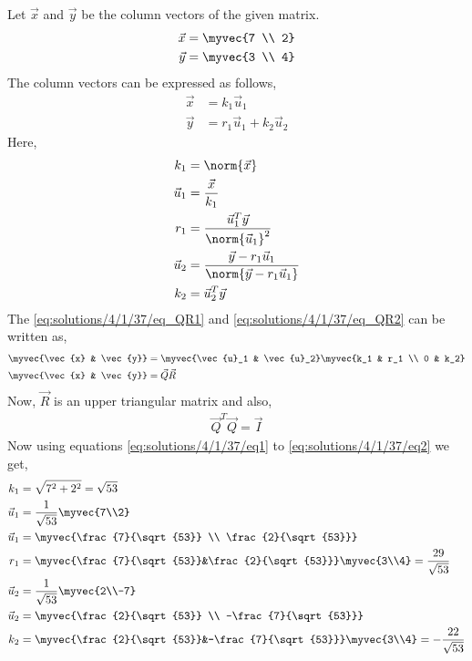 Let $\vec{x}$ and $\vec{y}$ be the column vectors of the given matrix.
\begin{align}
    \vec{x} &= \myvec{7 \\ 2} \\
    \vec{y} &= \myvec{3 \\ 4}
\end{align}
The column vectors can be expressed as follows,
\begin{align}
    \vec{x} &= k_1\vec{u}_1\label{eq:solutions/4/1/37/eq_QR1}\\
    \vec{y} &= r_1\vec{u}_1+k_2\vec{u}_2\label{eq:solutions/4/1/37/eq_QR2}
\end{align}
Here, 
\begin{align}
    k_1 &= \norm{\vec{x}}\label{eq:solutions/4/1/37/eq1}\\
    \vec{u}_1 &= \frac{\vec{x}}{k_1}\\
    r_1 &= \frac{\vec{u}_1^T\vec{y}}{\norm{\vec{u}_1}^2}\\
    \vec{u}_2 &= \frac{\vec{y} - r_1 \vec{u}_1}{\norm{\vec{y} - r_1 \vec{u}_1}}\\
    k_2 &= {\vec{u}_2^T\vec{y}}\label{eq:solutions/4/1/37/eq2}
\end{align}
The \eqref{eq:solutions/4/1/37/eq_QR1} and \eqref{eq:solutions/4/1/37/eq_QR2} can be written as, 
\begin{align}
\myvec{\vec{x} & \vec{y}} &= \myvec{\vec{u}_1 & \vec{u}_2}\myvec{k_1 & r_1 \\ 0 & k_2}\\
\myvec{\vec{x} & \vec{y}} &= \vec{Q}\vec{R}\label{eq:solutions/4/1/37/QRMain}
\end{align}
Now, $\vec{R}$ is an upper triangular matrix and also,
\begin{align}
\vec{Q}^T\vec{Q}=\vec{I}
\end{align}
Now using equations \eqref{eq:solutions/4/1/37/eq1} to \eqref{eq:solutions/4/1/37/eq2} we get, 
\begin{align}
    k_1 &= \sqrt{7^2+2^2} = \sqrt{53}\label{eq:solutions/4/1/37/eqval1}\\ 
    \vec{u}_1 &= \frac{1}{\sqrt{53}}\myvec{7\\2}\\
    \vec{u}_1 &= \myvec{\frac{7}{\sqrt{53}} \\ \frac{2}{\sqrt{53}}} \\
    r_1 &= \myvec{\frac{7}{\sqrt{53}}&\frac{2}{\sqrt{53}}}\myvec{3\\4} = \frac{29}{\sqrt{53}}\\ 
    \vec{u}_2 &= \frac{1}{\sqrt{53}}\myvec{2\\-7}\\
    \vec{u}_2 &= \myvec{\frac{2}{\sqrt{53}} \\ -\frac{7}{\sqrt{53}}} \\
    k_2 &= \myvec{\frac{2}{\sqrt{53}}&-\frac{7}{\sqrt{53}}}\myvec{3\\4} = -\frac{22}{\sqrt{53}}\label{eq:solutions/4/1/37/eqval2} 
\end{align}
